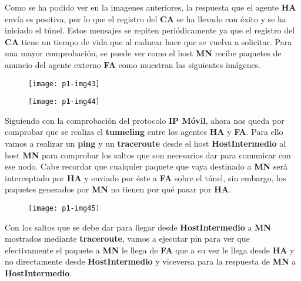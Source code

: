\documentclass[10pt]{article}
\begin{document}
Como se ha podido ver en la imagenes anteriores, la respuesta que el agente \textbf{HA} envía es positiva, por lo que el registro del \textbf{CA} se ha llevado con éxito y se ha iniciado el túnel. Estos mensajes se repiten periódicamente ya que el registro del \textbf{CA} tiene un tiempo de vida que al caducar hace que se vuelva a solicitar. Para una mayor comprobación, se puede ver como el host \textbf{MN} recibe paquetes de anuncio del agente externo \textbf{FA} como muestran las siguientes imágenes. \\

\begin{figure}[H]
	\begin{center}
 		\texttt{[image: p1-img43]}
	\end{center} 
\end{figure}

\begin{figure}[H]
	\begin{center}
 		\texttt{[image: p1-img44]}
	\end{center} 
\end{figure}


Siguiendo con la comprobación del protocolo \textbf{IP Móvil}, ahora nos queda por comprobar que se realiza el \textbf{tunneling} entre los agentes \textbf{HA} y \textbf{FA}. Para ello vamos a realizar un \textbf{ping} y un \textbf{traceroute} desde el host \textbf{HostIntermedio} al host \textbf{MN} para comprobar los saltos que son necesarios dar para comunicar con ese nodo. Cabe recordar que cualquier paquete que vaya destinado a \textbf{MN} será interceptado por \textbf{HA} y enviado por éste a \textbf{FA} sobre el túnel, sin embargo, los paquetes generados por \textbf{MN} no tienen por qué pasar por \textbf{HA}. \\ 

\begin{figure}[H]
	\begin{center}
 		\texttt{[image: p1-img45]}
	\end{center} 
\end{figure}

Con los saltos que se debe dar para llegar desde \textbf{HostIntermedio} a \textbf{MN} mostrados mediante \textbf{traceroute}, vamos a ejecutar pin para ver que efectivamente el paquete a \textbf{MN} le llega de \textbf{FA} que a su vez le llega desde \textbf{HA} y no directamente desde \textbf{HostIntermedio} y viceversa para la respuesta de \textbf{MN} a \textbf{HostIntermedio}.\\
\end{document}
